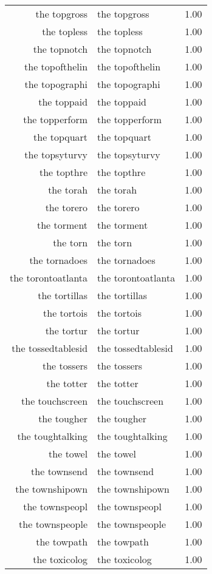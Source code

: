\begin{table}[ht]
\begin{tabular}{rlr}
  the topgross & the topgross & 1.00 \\ 
  the topless & the topless & 1.00 \\ 
  the topnotch & the topnotch & 1.00 \\ 
  the topofthelin & the topofthelin & 1.00 \\ 
  the topographi & the topographi & 1.00 \\ 
  the toppaid & the toppaid & 1.00 \\ 
  the topperform & the topperform & 1.00 \\ 
  the topquart & the topquart & 1.00 \\ 
  the topsyturvy & the topsyturvy & 1.00 \\ 
  the topthre & the topthre & 1.00 \\ 
  the torah & the torah & 1.00 \\ 
  the torero & the torero & 1.00 \\ 
  the torment & the torment & 1.00 \\ 
  the torn & the torn & 1.00 \\ 
  the tornadoes & the tornadoes & 1.00 \\ 
  the torontoatlanta & the torontoatlanta & 1.00 \\ 
  the tortillas & the tortillas & 1.00 \\ 
  the tortois & the tortois & 1.00 \\ 
  the tortur & the tortur & 1.00 \\ 
  the tossedtablesid & the tossedtablesid & 1.00 \\ 
  the tossers & the tossers & 1.00 \\ 
  the totter & the totter & 1.00 \\ 
  the touchscreen & the touchscreen & 1.00 \\ 
  the tougher & the tougher & 1.00 \\ 
  the toughtalking & the toughtalking & 1.00 \\ 
  the towel & the towel & 1.00 \\ 
  the townsend & the townsend & 1.00 \\ 
  the townshipown & the townshipown & 1.00 \\ 
  the townspeopl & the townspeopl & 1.00 \\ 
  the townspeople & the townspeople & 1.00 \\ 
  the towpath & the towpath & 1.00 \\ 
  the toxicolog & the toxicolog & 1.00 \\ 

\end{tabular}
\end{table}
